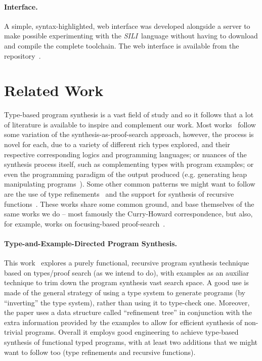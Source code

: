 \documentclass{llncs}
\newcommand{\mypara}[1]{\paragraph{\textbf{#1}.}}
\newcommand{\synname}{\emph{SILI}}
\begin{document}
\mypara{Interface} A simple, syntax-highlighted, web interface was developed
alongside a server to make possible experimenting with the \synname\ 
language without having to download and compile the complete toolchain. The web
interface is available from the repository~\cite{github repo}.





\section{Related Work}

Type-based program synthesis is a vast field of study and so it
follows that a lot of literature is available to inspire and
complement our work. Most works~\cite{DBLP:conf/lopstr/HughesO20,DBLP:conf/pldi/PolikarpovaKS16,DBLP:conf/pldi/OseraZ15,DBLP:conf/popl/FrankleOWZ16} follow some variation of the
synthesis-as-proof-search approach, however, the process is novel for
each, due to a variety of different rich types explored, and their
respective corresponding logics and programming languages; or nuances
of the synthesis process itself, such as complementing types with
program examples; or even the programming paradigm of the output
produced (e.g. generating heap manipulating
programs~\cite{DBLP:journals/pacmpl/PolikarpovaS19}).  Some other
common patterns we might want to follow are the use of type
refinements~\cite{DBLP:conf/pldi/PolikarpovaKS16} and the support for synthesis of recursive
functions~\cite{DBLP:conf/pldi/PolikarpovaKS16,DBLP:conf/pldi/OseraZ15}.  These works share some common ground, and base
themselves of the same works we do -- most famously the Curry-Howard
correspondence, but also, for example, works on focusing-based
proof-search~\cite{10.1093/logcom/2.3.297}.

\mypara{Type-and-Example-Directed Program Synthesis} This
work~\cite{DBLP:conf/pldi/OseraZ15,DBLP:conf/popl/FrankleOWZ16}
explores a purely functional, recursive program synthesis technique
based on types/proof search (as we intend to do), with examples as an
auxiliar technique to trim down the program synthesis vast search
space. A good use is
made of the general strategy of using a type system to generate
programs (by ``inverting'' the type system), rather than using it to
type-check one.  Moreover, the paper uses a data structure called
``refinement tree'' in conjunction with the extra information provided
by the examples to allow for efficient synthesis of non-trivial
programs. Overall it employs good engineering to achieve type-based
synthesis of functional typed programs, with at least two additions
that we might want to follow too (type refinements and recursive
functions).
\end{document}
